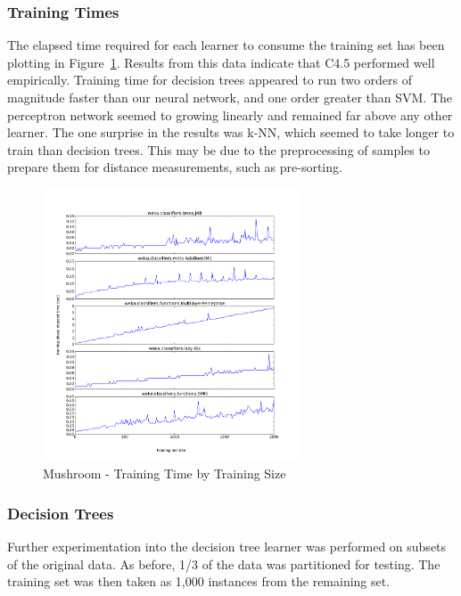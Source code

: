 \documentclass{sig-alternate}
\begin{document}
\subsubsection{Training Times}

The elapsed time required for each learner to consume the training set has been plotting in Figure~\ref{ag-runtime}. Results from this data indicate that C4.5 performed well empirically. Training time for decision trees appeared to run two orders of magnitude faster than our neural network, and one order greater than SVM. The perceptron network seemed to growing linearly and remained far above any other learner. The one surprise in the results was k-NN, which seemed to take longer to train than decision trees. This may be due to the preprocessing of samples to prepare them for distance measurements, such as pre-sorting.


\begin{figure}
    \centering
    \includegraphics[width=3in]{data/agaricus-lepiota/learning-curve-10to2000/runtime.pdf}
    \caption{Mushroom - Training Time by Training Size \label{ag-runtime}}
\end{figure} 


\subsubsection{Decision Trees}

Further experimentation into the decision tree learner was performed on subsets of the original data. As before, 1/3 of the data was partitioned for testing. The training set was then taken as 1,000 instances from the remaining set.
\end{document}
